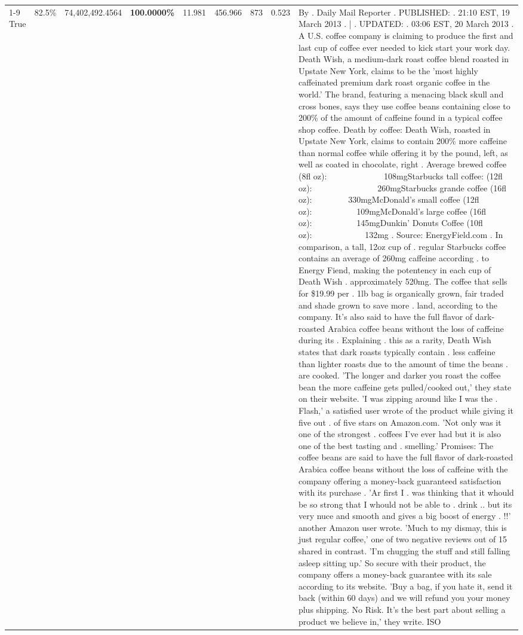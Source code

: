 \begin{table}[H]
{\begin{tabular}{lllrlllll}
\cline{1-9}
True & 82.5\% & 74,402,492.4564 & \bfseries \color{red} 100.0000\% & 11.981 & 456.966 & 873 & 0.523 & By . Daily Mail Reporter . PUBLISHED: . 21:10 EST, 19 March 2013 . | . UPDATED: . 03:06 EST, 20 March 2013 . A U.S. coffee company is claiming to produce the first and last cup of coffee ever needed to kick start your work day. Death Wish, a medium-dark roast coffee blend roasted in Upstate New York, claims to be the 'most highly caffeinated premium dark roast organic coffee in the world.' The brand, featuring a menacing black skull and cross bones, says they use coffee beans containing close to 200\% of the amount of caffeine found in a typical coffee shop coffee. Death by coffee: Death Wish, roasted in Upstate New York, claims to contain 200\% more caffeine than normal coffee while offering it by the pound, left, as well as coated in chocolate, right . Average brewed coffee (8fl oz):              108mgStarbucks tall coffee: (12fl oz):                260mgStarbucks grande coffee (16fl oz):         330mgMcDonald's small coffee (12fl oz):           109mgMcDonald's large coffee (16fl oz):           145mgDunkin' Donuts Coffee (10fl oz):             132mg . Source: EnergyField.com . In comparison, a tall, 12oz cup of . regular Starbucks coffee contains an average of 260mg caffeine according . to Energy Fiend, making the potentency in each cup of Death Wish . approximately 520mg. The coffee that sells for \$19.99 per . 1lb bag is organically grown, fair traded and shade grown to save more . land, according to the company. It's also said to have the full flavor of dark-roasted Arabica coffee beans without the loss of caffeine during its . Explaining . this as a rarity, Death Wish states that dark roasts typically contain . less caffeine than lighter roasts due to the amount of time the beans . are cooked. 'The longer and darker you roast the coffee bean the more caffeine gets pulled/cooked out,' they state on their website. 'I was zipping around like I was the . Flash,' a satisfied user wrote of the product while giving it five out . of five stars on Amazon.com. 'Not only was it one of the strongest . coffees I've ever had but it is also one of the best tasting and . smelling.’ Promises: The coffee beans are said to have the full flavor of dark-roasted Arabica coffee beans without the loss of caffeine with the company offering a money-back guaranteed satisfaction with its purchase . 'Ar first I . was thinking that it whould be so strong that I whould not be able to . drink .. but its very nuce and smooth and gives a big boost of energy . !!' another Amazon user wrote. 'Much to my dismay, this is just regular coffee,' one of two negative reviews out of 15 shared in contrast. 'I'm chugging the stuff and still falling asleep sitting up.' So secure with their product, the company offers a money-back guarantee with its sale according to its website. 'Buy a bag, if you hate it, send it back (within 60 days) and we will refund you your money plus shipping. No Risk. It’s the best part about selling a product we believe in,' they write. ISO \\

\end{tabular}}
\end{table}
